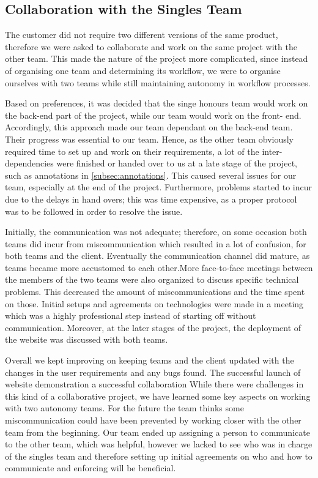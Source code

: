 \documentclass{l3proj}
\begin{document}
\subsection{Collaboration with the Singles Team}
The customer did not require two different versions of the same product, therefore we were asked to collaborate and work on the same project with the other team. This made the nature of the project more complicated, since instead of organising one team and determining its workflow, we were to organise ourselves with two teams while still maintaining autonomy in workflow processes.

Based on preferences, it was decided that the singe honours team would work on the back-end part of the project, while our team would work on the front- end. Accordingly, this approach made our team dependant on the back-end team. Their progress was essential to our team. Hence, as the other team obviously required time to set up and work on their requirements, a lot of the inter-dependencies were finished or handed over to us at a late stage of the project, such as annotations in \ref{subsec:annotations}. This caused several issues for our team, especially at the end of the project. Furthermore, problems started to incur due to the delays in hand overs; this was time expensive, as a proper protocol was to be followed in order to resolve the issue. 

Initially, the communication was not adequate; therefore, on some occasion both teams did incur from miscommunication which resulted in a lot of confusion, for both teams and the client. Eventually the communication channel did mature, as teams became more accustomed to each other.More face-to-face meetings between the members of the two teams were also organized to discuss specific technical problems. This decreased the amount of miscommunications and the time spent on those.  Initial setups and agreements on technologies were made in a meeting which was a highly professional step instead of starting off without communication. Moreover, at the later stages of the project, the deployment of the website was discussed with both teams. 

Overall we kept improving on keeping teams and the client updated with the changes in the user requirements and any bugs found. The successful launch of website demonstration a successful collaboration While there were challenges in this kind of a collaborative project, we have learned some key aspects on working with two autonomy teams. For the future the team thinks some miscommunication could have been prevented by working closer with the other team from the beginning. Our team ended up assigning a person to communicate to the other team, which was helpful, however we lacked to see who was in charge of the singles team and therefore setting up initial agreements on who and how to communicate and enforcing will be beneficial.
\end{document}
